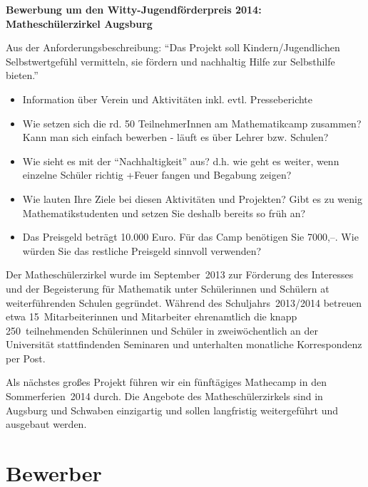 \documentclass[12pt]{zettel}
\begin{document}
\renewcommand{\betreff}{}

\makeletterhead{}

\vspace{-2em}

\begin{center}
  \Large\textbf{\textsf{Bewerbung um den Witty-Jugendförderpreis 2014: \\
  Matheschülerzirkel Augsburg }}
\end{center}

Aus der Anforderungsbeschreibung: "`Das Projekt soll
Kindern/Jugendlichen Selbstwertgefühl vermitteln, sie fördern und nachhaltig
Hilfe zur Selbsthilfe bieten."'

\begin{itemize}
\item Information über Verein und Aktivitäten inkl. evtl. Presseberichte
\item Wie setzen sich die rd. 50 TeilnehmerInnen am Mathematikcamp zusammen? Kann
man sich einfach bewerben - läuft es über Lehrer bzw. Schulen?
\item Wie sieht es mit der "`Nachhaltigkeit"' aus? d.h. wie geht es weiter, wenn
einzelne Schüler richtig +Feuer fangen und Begabung zeigen?
\item Wie lauten Ihre Ziele bei diesen Aktivitäten und Projekten? Gibt es zu
wenig Mathematikstudenten und setzen Sie deshalb bereits so früh an?
\item Das Preisgeld beträgt 10.000 Euro. Für das Camp benötigen Sie 7000,--. Wie
würden Sie das restliche Preisgeld sinnvoll verwenden?
\end{itemize}

Der Matheschülerzirkel wurde im September~2013 zur Förderung des
Interesses und der Begeisterung für Mathematik unter Schülerinnen und Schülern
at weiterführenden Schulen gegründet. Während des Schuljahrs~2013/2014 betreuen
etwa 15~Mitarbeiterinnen und Mitarbeiter ehrenamtlich die knapp
250~teilnehmenden Schülerinnen und Schüler in zweiwöchentlich an der
Universität stattfindenden Seminaren und unterhalten monatliche Korrespondenz
per Post.

Als nächstes großes Projekt führen wir ein fünftägiges Mathecamp in den
Sommerferien~2014 durch. Die Angebote des Matheschülerzirkels sind in Augsburg
und Schwaben einzigartig und sollen langfristig weitergeführt und ausgebaut
werden.


\section{Bewerber}
\end{document}
